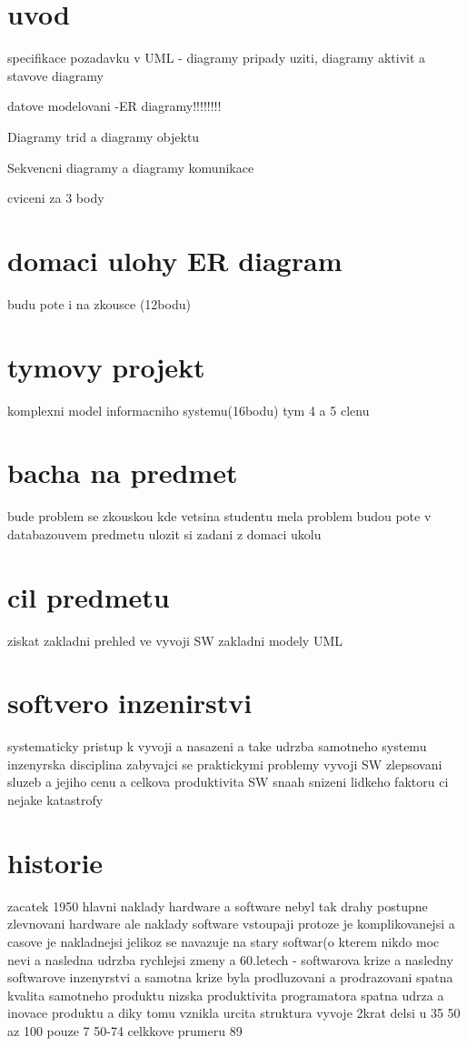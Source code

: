 \documentclass{article}
\begin{document}
\section{uvod}
specifikace pozadavku v UML - diagramy pripady uziti, diagramy aktivit
a stavove diagramy

datove modelovani -ER diagramy!!!!!!!!

Diagramy trid a diagramy objektu

Sekvencni diagramy a diagramy komunikace

cviceni za 3 body
\section{domaci ulohy ER diagram}
budu pote i na zkousce (12bodu)
\section{tymovy projekt}
komplexni model informacniho systemu(16bodu)
tym 4 a 5 clenu
\section{bacha na predmet}
bude problem se zkouskou kde vetsina studentu mela problem
budou pote v databazouvem predmetu ulozit si zadani z domaci ukolu
\section{cil predmetu}
ziskat zakladni prehled ve vyvoji SW
zakladni modely UML
\section{softvero inzenirstvi}
systematicky pristup k vyvoji a nasazeni a take udrzba samotneho systemu
inzenyrska disciplina zabyvajci se praktickymi problemy vyvoji SW
zlepsovani sluzeb a jejiho cenu a celkova produktivita SW
snaah snizeni lidkeho faktoru ci nejake katastrofy
\section{historie}
zacatek 1950 hlavni naklady hardware a software nebyl tak drahy
postupne zlevnovani hardware ale naklady software vstoupaji protoze je komplikovanejsi
a casove je nakladnejsi jelikoz se navazuje na stary softwar(o kterem nikdo moc nevi
a nasledna udrzba rychlejsi zmeny a
60.letech - softwarova krize a nasledny softwarove inzenyrstvi a samotna krize byla
prodluzovani a prodrazovani
spatna kvalita samotneho produktu
nizska produktivita programatora
spatna udrza a inovace produktu
a diky tomu vznikla urcita struktura vyvoje
2krat delsi u 35%
50 az 100 %
pouze 7%
50-74%
celkkove prumeru 89%
\end{document}
